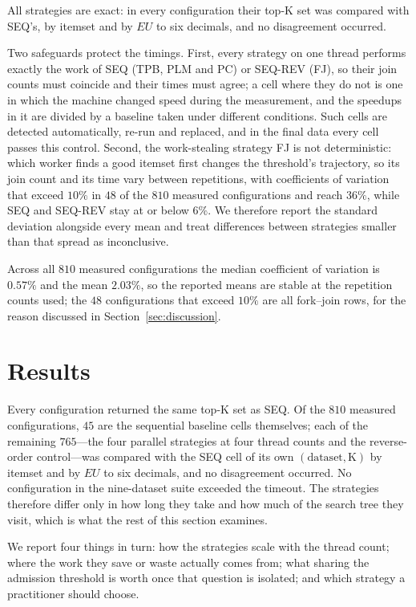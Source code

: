 \documentclass[pdflatex,sn-vancouver-num]{sn-jnl}
\theoremstyle{thmstyleone}%
\theoremstyle{thmstyletwo}%
\theoremstyle{thmstylethree}%
\newcommand{\EU}{\mathit{EU}}
\newcommand{\Kk}{\mathrm{K}}
\begin{document}
All strategies are exact: in every configuration their top-$\Kk$ set was
compared with SEQ's, by itemset and by $\EU$ to six decimals, and no
disagreement occurred.
 
Two safeguards protect the timings. First, every strategy on one thread
performs exactly the work of SEQ (TPB, PLM and PC) or SEQ-REV (FJ), so
their join counts must coincide and their times must agree; a cell where
they do not is one in which the machine changed speed during the
measurement, and the speedups in it are divided by a baseline taken under
different conditions. Such cells are detected automatically, re-run and
replaced, and in the final data every cell passes this control. Second,
the work-stealing strategy FJ is not deterministic: which worker finds a
good itemset first changes the threshold's trajectory, so its join count
and its time vary between repetitions, with coefficients of variation that exceed $10\%$ in $48$ of the $810$
measured configurations and reach $36\%$, while SEQ and SEQ-REV stay at
or below $6\%$. We therefore report the standard deviation alongside every mean
and treat differences between strategies smaller than that spread as
inconclusive.

Across all $810$ measured configurations the median coefficient of
variation is $0.57\%$ and the mean $2.03\%$, so the reported means are
stable at the repetition counts used; the $48$ configurations that exceed
$10\%$ are all fork--join rows, for the reason discussed in
Section~\ref{sec:discussion}.

\FloatBarrier
\section{Results}\label{sec:results}
 
Every configuration returned the same top-$\Kk$ set as SEQ. Of the
$810$ measured configurations, $45$ are the sequential baseline cells
themselves; each of the remaining $765$---the four parallel strategies
at four thread counts and the reverse-order control---was compared with
the SEQ cell of its own $(\text{dataset},\Kk)$ by itemset and by $\EU$
to six decimals, and no disagreement occurred. No configuration in the
nine-dataset suite exceeded the timeout. The
strategies therefore differ only in how long they take and how much of
the search tree they visit, which is what the rest of this section
examines.
 
We report four things in turn: how the strategies scale with the thread
count; where the work they save or waste actually comes from; what
sharing the admission threshold is worth once that question is isolated;
and which strategy a practitioner should choose.
 
\end{document}
